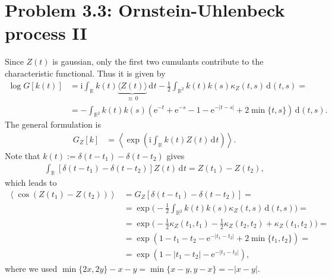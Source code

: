 \documentclass[english, parskip=full]{scrartcl}
\newcommand\numberthis{\addtocounter{equation}{1}\tag{\theequation}}
\newcommand{\bra}{}
\newcommand{\intr}{}
\newcommand{\kla}{}
\newcommand{\klam}{}
\renewcommand{\i}{\text{i}}
\newcommand{\e}{\text{e}}
\begin{document}
\section*{Problem 3.3: Ornstein-Uhlenbeck process II}
Since $Z(t)$ is gaussian, only the first two cumulants contribute to the characteristic functional.  
Thus it is given by 
\begin{align}
\log G[k(t)] &= \i\intr\int_{\mathbb{R}^{ }} k(t)\underbrace{\bra\langle Z(t) \rangle}_{\equiv\, 0} \, \mathrm{d}^{ }t - \frac{1}{2}\intr\int_{\mathbb{R}^{2}} k(t)k(s)\kappa_Z(t,s) \, \mathrm{d}^{}(t,s) = \\
&= -\intr\int_{\mathbb{R}^2} k(t)k(s)\kla\left( \e^{-t} + \e^{-s} - 1 - \e^{-|t-s|} + 2\min\{t,s\} \right) \, \mathrm{d}^{}(t,s).
\end{align}
The general formulation is
\begin{align}
G_Z[k] &= \left\bra\langle \exp\kla\left( \i\intr\int_{\mathbb{R}^{ }} k(t)Z(t) \, \mathrm{d}^{ }t \right) \right\rangle.
\end{align}
Note that $k(t) := \delta(t-t_1) - \delta(t-t_2)$ gives
\begin{align}
\intr\int_{\mathbb{R}^{ }} \klam\left[ \delta(t-t_1) - \delta(t-t_2) \right]Z(t) \, \mathrm{d}^{ }t = Z(t_1) - Z(t_2), 
\end{align}
which leads to
\begin{align}
\left\langle \cos\kla\left( Z(t_1) - Z(t_2) \right) \right\rangle &= G_Z[\delta(t-t_1) - \delta(t-t_2)] =   \\
&= \exp\kla\bigg( -\frac{1}{2}\intr\int_{\mathbb{R}^2} k(t)k(s) \kappa_Z(t,s) \, \mathrm{d}(t,s) \bigg) =  \\
&= \exp\kla\Big( -\frac{1}{2}\kappa_Z(t_1,t_1) - \frac{1}{2}\kappa_Z(t_2,t_2) + \kappa_Z(t_1,t_2) \Big) = \\
&= \exp\kla\left( 1 - t_1 - t_2 - \e^{-|t_1-t_2|} + 2\min\{t_1,t_2\}  \right)  = \\
&= \exp\kla\left( 1 - |t_1 - t_2| - \e^{-|t_1-t_2|} \right),
\end{align}
where we used $\min\{2x,2y\}-x-y = \min\{x-y,y-x\} = -|x-y|$.
\end{document}
